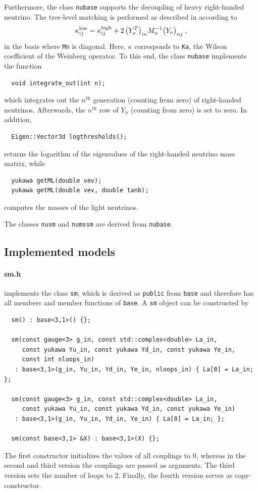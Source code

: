 \documentclass[11pt,a4paper]{article}
\begin{document}
Furthermore, the class \texttt{nubase} supports the decoupling of heavy right-handed neutrino. The tree-level matching is performed as described in \cite{Antusch:2005gp} according to
\begin{equation}
    \kappa_{ij}^{\rm low} = \kappa_{ij}^{\rm high} + 2\, \bigl(Y_\nu^T\bigr)_{in} M_n^{-1} \bigl(Y_\nu\bigr)_{nj} \;,
\end{equation}
in the basis where \texttt{Mn} is diagonal. Here, $\kappa$ corresponds to \texttt{Ka}, the Wilson coefficient of the Weinberg operator.
To this end, the class \texttt{nubase} implements the function
\begin{lstlisting}
  void integrate_out(int n);
\end{lstlisting}
which integrates out the $n^\mathrm{th}$ generation (counting from zero) of right-handed neutrinos. 
Afterwards, the $n^\mathrm{th}$ row of $Y_n$ (counting from zero) is set to zero.
In addition, 
\begin{lstlisting}
  Eigen::Vector3d logthresholds();
\end{lstlisting}
returns the logarithm of the eigenvalues of the right-handed neutrino mass matrix, while
\begin{lstlisting}
  yukawa getML(double vev);
  yukawa getML(double vev, double tanb);
\end{lstlisting}
computes the masses of the light neutrinos.

The classes \texttt{nusm} and \texttt{numssm} are derived from \texttt{nubase}.

\subsection{\label{sec::models} Implemented models}
\paragraph{sm.h}
implements the class \texttt{sm}, which is derived as \texttt{public} from \texttt{base} and therefore has all members and member functions of \texttt{base}. A \texttt{sm} object can be constructed by
\begin{lstlisting}
  sm() : base<3,1>() {};
  
  sm(const gauge<3> g_in, const std::complex<double> La_in,
     const yukawa Yu_in, const yukawa Yd_in, const yukawa Ye_in,
     const int nloops_in)
   : base<3,1>(g_in, Yu_in, Yd_in, Ye_in, nloops_in) { La[0] = La_in; };
   
  sm(const gauge<3> g_in, const std::complex<double> La_in,
     const yukawa Yu_in, const yukawa Yd_in, const yukawa Ye_in)
   : base<3,1>(g_in, Yu_in, Yd_in, Ye_in) { La[0] = La_in; };
   
  sm(const base<3,1> &X) : base<3,1>(X) {};
\end{lstlisting}
The first constructor initializes the values of all couplings to $0$, whereas in the second and third version the couplings are passed as arguments. The third version sets the number of loops to $2$.
Finally, the fourth version serves as copy-constructor.
\end{document}
